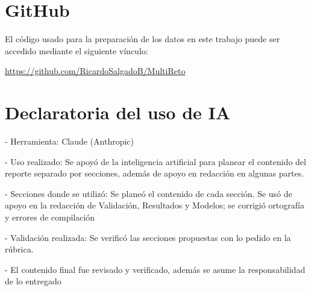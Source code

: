 \documentclass[11pt]{article}
\begin{document}
\section{GitHub}

El código usado para la preparación de los datos en este trabajo puede ser accedido mediante el siguiente vínculo:

\url{https://github.com/RicardoSalgadoB/MultiReto}

\section{Declaratoria del uso de IA}

- Herramienta: Claude (Anthropic)

- Uso realizado: Se apoyó de la inteligencia artificial para planear el contenido del reporte separado por secciones, además de apoyo en redacción en algunas partes.

- Secciones donde se utilizó: Se planeó el contenido de cada sección. Se usó de apoyo en la redacción de Validación, Resultados y Modelos; se corrigió ortografía y errores de compilación 

- Validación realizada: Se verificó las secciones propuestas con lo pedido en la rúbrica.

- El contenido final fue revisado y verificado, además se asume la responsabilidad de lo entregado




\pagebreak

\nocite{*}


\end{document}
